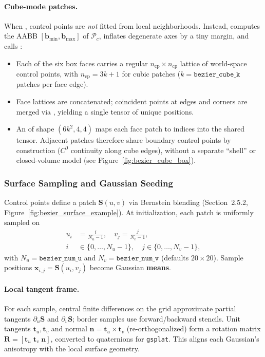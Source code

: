 \paragraph{Cube-mode patches.}
When , control points are \emph{not} fitted from local neighborhoods. Instead,  computes the AABB $[\mathbf{b}_{\min},\mathbf{b}_{\max}]$ of $\mathcal{P}_c$, inflates degenerate axes by a tiny margin, and calls :
\begin{itemize}
    \item Each of the six box faces carries a regular $n_{\mathrm{cp}}\times n_{\mathrm{cp}}$ lattice of world-space control points, with $n_{\mathrm{cp}} = 3k+1$ for cubic patches ($k=\texttt{bezier\_cube\_k}$ patches per face edge).
    \item Face lattices are concatenated; coincident points at edges and corners are merged via , yielding a single tensor  of unique positions.
    \item An  of shape $(6k^2,4,4)$ maps each face patch to indices into the shared tensor. Adjacent patches therefore share boundary control points by construction ($C^0$ continuity along cube edges), without a separate ``shell'' or closed-volume model (see Figure~\ref{fig:bezier_cube_box}).
\end{itemize}

\subsubsection{Surface Sampling and Gaussian Seeding}
\label{subsec:bezier_surface_sampling}

Control points define a patch $\mathbf{S}(u,v)$ via Bernstein blending (Section~2.5.2, Figure~\ref{fig:bezier_surface_example}). At initialization, each patch is uniformly sampled on
\begin{align}
u_i &= \frac{i}{N_u-1},\quad v_j = \frac{j}{N_v-1}, \\
i &\in \{0,\ldots,N_u-1\},\quad j \in \{0,\ldots,N_v-1\},
\end{align}
with $N_u=\texttt{bezier\_num\_u}$ and $N_v=\texttt{bezier\_num\_v}$ (defaults $20\times 20$). Sample positions $\mathbf{x}_{i,j}=\mathbf{S}(u_i,v_j)$ become Gaussian \textbf{means}.

\paragraph{Local tangent frame.}
For each sample, central finite differences on the grid approximate partial tangents $\partial_u\mathbf{S}$ and $\partial_v\mathbf{S}$; border samples use forward/backward stencils. Unit tangents $\mathbf{t}_u,\mathbf{t}_v$ and normal $\mathbf{n}=\mathbf{t}_u\times\mathbf{t}_v$ (re-orthogonalized) form a rotation matrix $\mathbf{R}=[\mathbf{t}_u\;\mathbf{t}_v\;\mathbf{n}]$, converted to quaternions for \texttt{gsplat}. This aligns each Gaussian's anisotropy with the local surface geometry.

